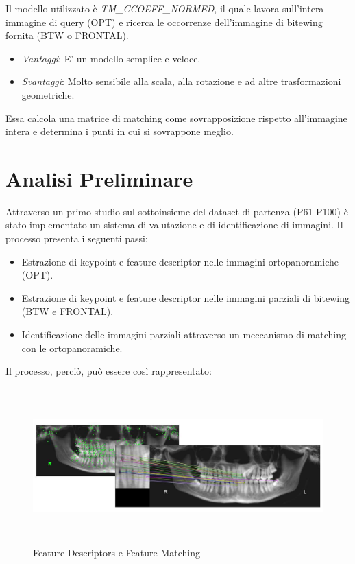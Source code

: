 \documentclass[12pt,a4paper,openright,twoside]{book}
\begin{document}
Il modello utilizzato è {\itshape TM\_CCOEFF\_NORMED}, il quale lavora sull'intera immagine di query (OPT) e ricerca le occorrenze dell'immagine di bitewing fornita (BTW o FRONTAL).
\begin{itemize}
\item {\itshape Vantaggi}: E' un modello semplice e veloce.
\item {\itshape Svantaggi}: Molto sensibile alla scala, alla rotazione e ad altre trasformazioni geometriche.
\end{itemize}
Essa calcola una matrice di matching come sovrapposizione rispetto all'immagine intera e determina i punti in cui si sovrappone meglio.

\section{Analisi Preliminare}
Attraverso un primo studio sul sottoinsieme del dataset di partenza (P61-P100) è stato implementato un sistema di valutazione e di identificazione di immagini. Il processo presenta i seguenti passi:
\begin{itemize}
\item Estrazione di keypoint e feature descriptor nelle immagini ortopanoramiche (OPT).
\item Estrazione di keypoint e feature descriptor nelle immagini parziali di bitewing (BTW e FRONTAL).
\item Identificazione delle immagini parziali attraverso un meccanismo di matching con le ortopanoramiche.
\end{itemize}
Il processo, perciò, può essere così rappresentato:

\begin{figure}[H]
	\centering
	\includegraphics[height=6cm,width=16cm]{figures/keypoint.pdf}
    	\caption{Feature Descriptors e Feature Matching}
	\label{fig:keypointdescriptor}
\end{figure}
\end{document}
